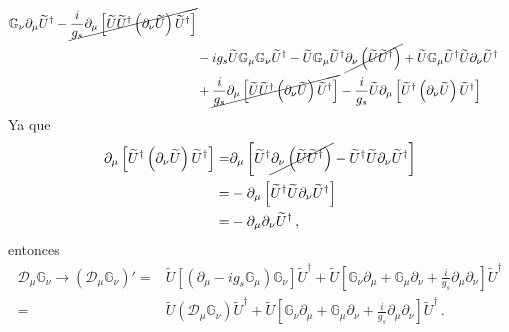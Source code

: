 \begin{align}
  \mathbb{G}_{\nu} \partial_{\mu} \widetilde{U}^{\dagger}
  -\cancel{\frac{i}{g_s}\partial_{\mu} \left[ \widetilde{U}
      \widetilde{U}^{\dagger}\left( \partial_{\nu}\widetilde{U} \right)\widetilde{U}^{\dagger} \right]}
  \nonumber\\
  &-i g_s \widetilde{U} \mathbb{G}_{\mu}\mathbb{G}_{\nu}\widetilde{U}^{\dagger}- \widetilde{U}\mathbb{G}_{\mu}
  \widetilde{U}^{\dagger}\cancel{ \partial_{\nu}\left( \widetilde{U}\widetilde{U}^{\dagger} \right)}+
  \widetilde{U}\mathbb{G}_{\mu} \widetilde{U}^{\dagger} \widetilde{U}\partial_{\nu}\widetilde{U}^{\dagger}
  \nonumber\\
  &+\cancel{\frac{i}{g_s} \partial_{\mu} \left[ \widetilde{U} \widetilde{U}^{\dagger}
      \left( \partial_{\nu}\widetilde{U} \right) \widetilde{U}^{\dagger}\right]}-
  \frac{i}{g_s} \widetilde{U} \partial_{\mu} \left[ \widetilde{U}^{\dagger}
    \left( \partial_{\nu}\widetilde{U} \right) \widetilde{U}^{\dagger}\right]
\end{align}
Ya que
\begin{align}
 \partial_{\mu} \left[ \widetilde{U}^{\dagger}
    \left( \partial_{\nu}\widetilde{U} \right) \widetilde{U}^{\dagger}\right]=&
 \partial_{\mu} \left[ \widetilde{U}^{\dagger}
    \cancel{\partial_{\nu}\left( \widetilde{U} \widetilde{U}^{\dagger}\right)} -\widetilde{U}^{\dagger}\widetilde{U} \partial_{\nu} \widetilde{U}^{\dagger}\right] \nonumber\\
=&- \partial_{\mu} \left[ \widetilde{U}^{\dagger} \widetilde{U} \partial_{\nu} \widetilde{U}^{\dagger}\right] \nonumber\\
=&- \partial_{\mu}  \partial_{\nu} \widetilde{U}^{\dagger} \,,
\end{align}
entonces
\begin{align}
\label{eq:Dmup}
\mathcal{D}_{\mu} \mathbb{G}_{\nu}\to   \left(   \mathcal{D}_{\mu} \mathbb{G}_{\nu} \right)' =& \widetilde{U} \left[ \left( \partial_{\mu}-ig_s \mathbb{G}_{\mu} \right)\mathbb{G}_\nu   \right]\widetilde{U}^{\dagger}
    + \widetilde{U} \left[ \mathbb{G}_{\nu} \partial_{\mu}+\mathbb{G}_{\mu}\partial_{\nu}+\frac{i}{g_s} \partial_{\mu}\partial_{\nu} \right] \widetilde{U}^{\dagger} \nonumber\\
 =& \widetilde{U} \left( \mathcal{D}_{\mu}\mathbb{G}_\nu   \right)\widetilde{U}^{\dagger}
    + \widetilde{U} \left[ \mathbb{G}_{\nu} \partial_{\mu}+\mathbb{G}_{\mu}\partial_{\nu}+\frac{i}{g_s} \partial_{\mu}\partial_{\nu} \right] \widetilde{U}^{\dagger} \,.%
\end{align} 
